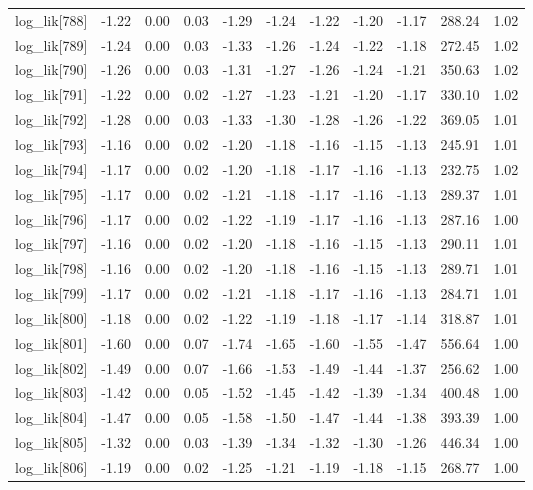 \begin{table}[ht]
\begin{tabular}{rrrrrrrrrrr}
  log\_lik[788] & -1.22 & 0.00 & 0.03 & -1.29 & -1.24 & -1.22 & -1.20 & -1.17 & 288.24 & 1.02 \\ 
  log\_lik[789] & -1.24 & 0.00 & 0.03 & -1.33 & -1.26 & -1.24 & -1.22 & -1.18 & 272.45 & 1.02 \\ 
  log\_lik[790] & -1.26 & 0.00 & 0.03 & -1.31 & -1.27 & -1.26 & -1.24 & -1.21 & 350.63 & 1.02 \\ 
  log\_lik[791] & -1.22 & 0.00 & 0.02 & -1.27 & -1.23 & -1.21 & -1.20 & -1.17 & 330.10 & 1.02 \\ 
  log\_lik[792] & -1.28 & 0.00 & 0.03 & -1.33 & -1.30 & -1.28 & -1.26 & -1.22 & 369.05 & 1.01 \\ 
  log\_lik[793] & -1.16 & 0.00 & 0.02 & -1.20 & -1.18 & -1.16 & -1.15 & -1.13 & 245.91 & 1.01 \\ 
  log\_lik[794] & -1.17 & 0.00 & 0.02 & -1.20 & -1.18 & -1.17 & -1.16 & -1.13 & 232.75 & 1.02 \\ 
  log\_lik[795] & -1.17 & 0.00 & 0.02 & -1.21 & -1.18 & -1.17 & -1.16 & -1.13 & 289.37 & 1.01 \\ 
  log\_lik[796] & -1.17 & 0.00 & 0.02 & -1.22 & -1.19 & -1.17 & -1.16 & -1.13 & 287.16 & 1.00 \\ 
  log\_lik[797] & -1.16 & 0.00 & 0.02 & -1.20 & -1.18 & -1.16 & -1.15 & -1.13 & 290.11 & 1.01 \\ 
  log\_lik[798] & -1.16 & 0.00 & 0.02 & -1.20 & -1.18 & -1.16 & -1.15 & -1.13 & 289.71 & 1.01 \\ 
  log\_lik[799] & -1.17 & 0.00 & 0.02 & -1.21 & -1.18 & -1.17 & -1.16 & -1.13 & 284.71 & 1.01 \\ 
  log\_lik[800] & -1.18 & 0.00 & 0.02 & -1.22 & -1.19 & -1.18 & -1.17 & -1.14 & 318.87 & 1.01 \\ 
  log\_lik[801] & -1.60 & 0.00 & 0.07 & -1.74 & -1.65 & -1.60 & -1.55 & -1.47 & 556.64 & 1.00 \\ 
  log\_lik[802] & -1.49 & 0.00 & 0.07 & -1.66 & -1.53 & -1.49 & -1.44 & -1.37 & 256.62 & 1.00 \\ 
  log\_lik[803] & -1.42 & 0.00 & 0.05 & -1.52 & -1.45 & -1.42 & -1.39 & -1.34 & 400.48 & 1.00 \\ 
  log\_lik[804] & -1.47 & 0.00 & 0.05 & -1.58 & -1.50 & -1.47 & -1.44 & -1.38 & 393.39 & 1.00 \\ 
  log\_lik[805] & -1.32 & 0.00 & 0.03 & -1.39 & -1.34 & -1.32 & -1.30 & -1.26 & 446.34 & 1.00 \\ 
  log\_lik[806] & -1.19 & 0.00 & 0.02 & -1.25 & -1.21 & -1.19 & -1.18 & -1.15 & 268.77 & 1.00 \\ 

\end{tabular}
\end{table}
